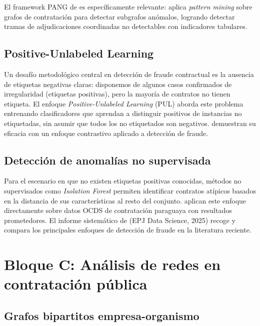 \documentclass[11pt,a4paper,spanish]{book}
\numberwithin{equation}{chapter}
\numberwithin{figure}{chapter}
\begin{document}
El framework PANG de  es espec{\'i}ficamente relevante: aplica \textit{pattern mining} sobre grafos de contrataci{\'o}n para detectar subgrafos anómalos, logrando detectar tramas de adjudicaciones coordinadas no detectables con indicadores tabulares.

\subsection{Positive-Unlabeled Learning}

Un desaf{\'i}o metodol{\'o}gico central en detecci{\'o}n de fraude contractual es la ausencia de etiquetas negativas claras: disponemos de algunos casos confirmados de irregularidad (etiquetas positivas), pero la mayor{\'i}a de contratos no tienen etiqueta. El enfoque \textit{Positive-Unlabeled Learning} (PUL) \cite{PULearningIJCAI2021} aborda este problema entrenando clasificadores que aprendan a distinguir positivos de instancias no etiquetadas, sin asumir que todos los no etiquetados son negativos.  demuestran su eficacia con un enfoque contrastivo aplicado a detecci{\'o}n de fraude.

\subsection{Detecci{\'o}n de anomal{\'i}as no supervisada}

Para el escenario en que no existen etiquetas positivas conocidas, m{\'e}todos no supervisados como \textit{Isolation Forest} \cite{IsolationForestSklearn} permiten identificar contratos at{\'i}picos basados en la distancia de sus caracter{\'i}sticas al resto del conjunto.  aplican este enfoque directamente sobre datos OCDS de contrataci{\'o}n paraguaya con resultados prometedores. El informe sistem{\'a}tico de  (EPJ Data Science, 2025) recoge y compara los principales enfoques de detecci{\'o}n de fraude en la literatura reciente.

\section{Bloque C: An{\'a}lisis de redes en contrataci{\'o}n p{\'u}blica}

\subsection{Grafos bipartitos empresa-organismo}
\end{document}
